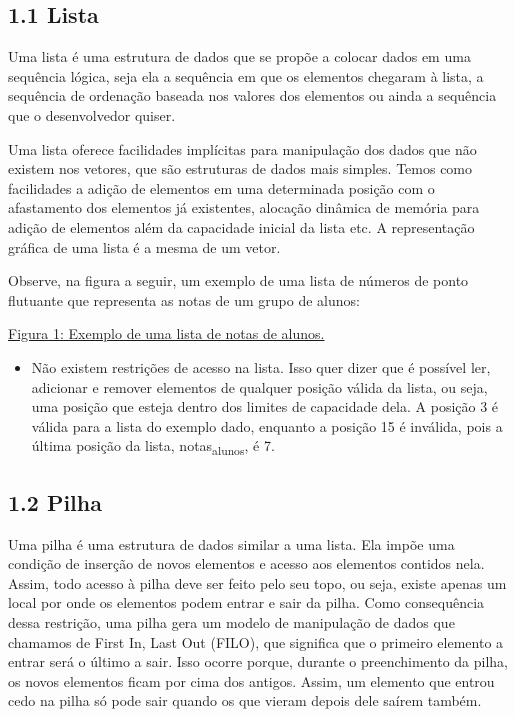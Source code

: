 \documentclass[11pt]{article}
\begin{document}
\subsection{1.1 Lista}
\label{sec:orged82547}
Uma lista é uma estrutura de dados que se propõe a colocar dados em uma sequência lógica, seja ela a sequência em que os elementos chegaram à lista, a sequência de ordenação baseada nos valores dos elementos ou ainda a sequência que o desenvolvedor quiser.

Uma lista oferece facilidades implícitas para manipulação dos dados que não existem nos vetores, que são estruturas de dados mais simples. Temos como facilidades a adição de elementos em uma determinada posição com o afastamento dos elementos já existentes, alocação dinâmica de memória para adição de elementos além da capacidade inicial da lista etc. A representação gráfica de uma lista é a mesma de um vetor.

Observe, na figura a seguir, um exemplo de uma lista de números de ponto flutuante que representa as notas de um grupo de alunos:

\href{figura1.png}{Figura 1: Exemplo de uma lista de notas de alunos.}

\begin{itemize}
\item Não existem restrições de acesso na lista. Isso quer dizer que é possível ler, adicionar e remover elementos de qualquer posição válida da lista, ou seja, uma posição que esteja dentro dos limites de capacidade dela. A posição 3 é válida para a lista do exemplo dado, enquanto a posição 15 é inválida, pois a última posição da lista, notas\textsubscript{alunos}, é 7.
\end{itemize}

\subsection{1.2 Pilha}
\label{sec:org1b3e6e5}
Uma pilha é uma estrutura de dados similar a uma lista. Ela impõe uma condição de inserção de novos elementos e acesso aos elementos contidos nela. Assim, todo acesso à pilha deve ser feito pelo seu topo, ou seja, existe apenas um local por onde os elementos podem entrar e sair da pilha. Como consequência dessa restrição, uma pilha gera um modelo de manipulação de dados que chamamos de First In, Last Out (FILO), que significa que o primeiro elemento a entrar será o último a sair. Isso ocorre porque, durante o preenchimento da pilha, os novos elementos ficam por cima dos antigos. Assim, um elemento que entrou cedo na pilha só pode sair quando os que vieram depois dele saírem também.
\end{document}
